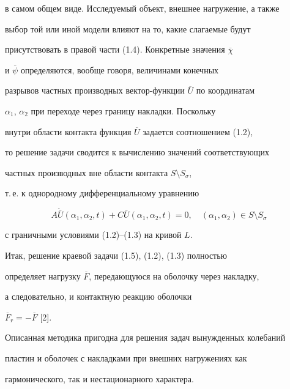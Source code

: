 в самом общем виде. Исследуемый объект, внешнее нагружение, а также


выбор той или иной модели влияют на то, какие слагаемые будут


присутствовать в правой части (1.4). Конкретные значения $\overline{\chi}$


и $\overline{\psi}$ определяются, вообще говоря, величинами конечных


разрывов частных производных вектор-функции $\overline U$ по координатам


$\alpha_{1}$, $\alpha_{2}$ при переходе через границу накладки. Поскольку


внутри области контакта функция $\overline U$ задается соотношением (1.2),


то решение задачи сводится к вычислению значений соответствующих


частных производных вне области контакта $S \setminus S_{\sigma}$,


т.\,е. к однородному дифференциальному уравнению


\begin{equation}


A\ddot{\overline U}(\alpha_{1},\alpha_{2},t)+


C\overline U(\alpha_{1},\alpha_{2},t)=0,


\quad(\alpha_{1},\alpha_{2})\in S\setminus S_{\sigma}


\tag{1.5}


\end{equation}


с граничными условиями (1.2)--(1.3) на кривой $L$.





Итак, решение краевой задачи (1.5), (1.2), (1.3) полностью


определяет нагрузку $\overline F$, передающуюся на оболочку через накладку,


а следовательно, и контактную реакцию оболочки


$\overline F_{r}=-\overline F$ [2].





Описанная методика пригодна для решения задач вынужденных колебаний


пластин и оболочек с накладками при внешних нагружениях как


гармонического, так и нестационарного характера.






